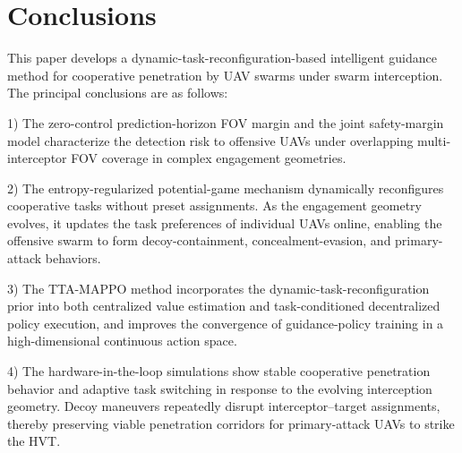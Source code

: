 \documentclass{cja}
\begin{document}
\section{Conclusions}
\label{sec:conclusion}

This paper develops a dynamic-task-reconfiguration-based intelligent guidance method for cooperative penetration by UAV swarms under swarm interception. The principal conclusions are as follows:

1) The zero-control prediction-horizon FOV margin and the joint safety-margin model characterize the detection risk to offensive UAVs under overlapping multi-interceptor FOV coverage in complex engagement geometries.

2) The entropy-regularized potential-game mechanism dynamically reconfigures cooperative tasks without preset assignments. As the engagement geometry evolves, it updates the task preferences of individual UAVs online, enabling the offensive swarm to form decoy-containment, concealment-evasion, and primary-attack behaviors.

3) The TTA-MAPPO method incorporates the dynamic-task-reconfiguration prior into both centralized value estimation and task-conditioned decentralized policy execution, and improves the convergence of guidance-policy training in a high-dimensional continuous action space.

4) The hardware-in-the-loop simulations show stable cooperative penetration behavior and adaptive task switching in response to the evolving interception geometry. Decoy maneuvers repeatedly disrupt interceptor--target assignments, thereby preserving viable penetration corridors for primary-attack UAVs to strike the HVT.
\end{document}
